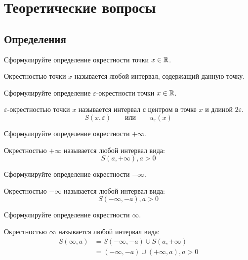 
\section{Теоретические вопросы}

\subsection{Определения}

\begin{question}
  Сформулируйте определение окрестности точки $x \in \mathbb{R}$. 
\end{question}
\begin{answer}
  Окрестностью точки $x$ называется любой интервал, содержащий данную точку.
\end{answer}

\begin{question}
  Сформулируйте определение $\varepsilon$-окрестности точки $x \in \mathbb{R}$.
\end{question}
\begin{answer}
  $\varepsilon$-окрестностью точки $x$ называется интервал с центром в точке $x$ и длиной $2\varepsilon$. \[
    S(x, \varepsilon) \qquad \text{или} \qquad u_{\varepsilon}(x)
  \] 
\end{answer}

\begin{question}
   Сформулируйте определение окрестности $+\infty$.
\end{question}
\begin{answer}
  Окрестностью $+\infty$ называется любой интервал вида: \[
  S(a, +\infty), a > 0
  \] 
\end{answer}

\begin{question}
   Сформулируйте определение окрестности $-\infty$.
\end{question}
\begin{answer}
  Окрестностью $-\infty$ называется любой интервал вида: \[
  S(-\infty, -a), a > 0
  \] 
\end{answer}

\begin{question}
   Сформулируйте определение окрестности $\infty$.
\end{question}
\begin{answer}
  Окрестностью $\infty$ называется любой интервал вида:
  \begin{align*}
    S(\infty, a) &= S(-\infty, -a) \cup S(a, +\infty) \\
            &= (-\infty, -a) \cup (+\infty, a), a > 0
  \end{align*}
\end{answer}

